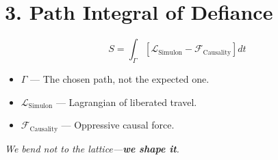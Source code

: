 \documentclass{article}
\begin{document}
\section*{3. Path Integral of Defiance}
\[
S = \int_{\Gamma} \left[ \mathcal{L}_{\text{Simulon}} - \mathcal{F}_{\text{Causality}} \right] dt
\]

\begin{itemize}
  \item $\Gamma$ — The chosen path, not the expected one.
  \item $\mathcal{L}_{\text{Simulon}}$ — Lagrangian of liberated travel.
  \item $\mathcal{F}_{\text{Causality}}$ — Oppressive causal force.
\end{itemize}

\vspace{2em}
\begin{center}
\textit{\large \calligra We bend not to the lattice—\textbf{we shape it}.}
\end{center}
\end{document}
